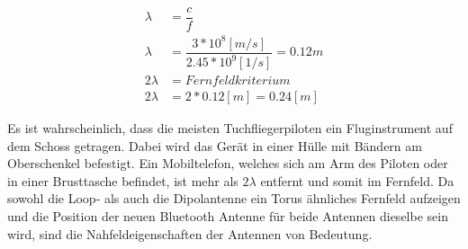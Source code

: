\begin{eqnarray}
\lambda &=\dfrac{c}{f} \\
\lambda &=\dfrac{3*10^{8} [m/s]}{2.45*10^{9} [1/s]}=0.12m\\ 
2\lambda &= Fernfeldkriterium\\ 
2\lambda &= 2*0.12[m] =0.24 [m] \label{eq:Fernfeld}
\end{eqnarray}

Es ist wahrscheinlich, dass die meisten Tuchfliegerpiloten ein Fluginstrument auf dem Schoss getragen. Dabei wird das Gerät in einer Hülle mit Bändern am Oberschenkel befestigt. Ein Mobiltelefon, welches sich am Arm des Piloten oder in einer Brusttasche befindet, ist mehr als $2\lambda$ entfernt und somit im Fernfeld. Da sowohl die Loop- als auch die Dipolantenne ein Torus ähnliches Fernfeld aufzeigen und die Position der neuen Bluetooth Antenne für beide Antennen dieselbe sein wird, sind die Nahfeldeigenschaften der Antennen von Bedeutung.

